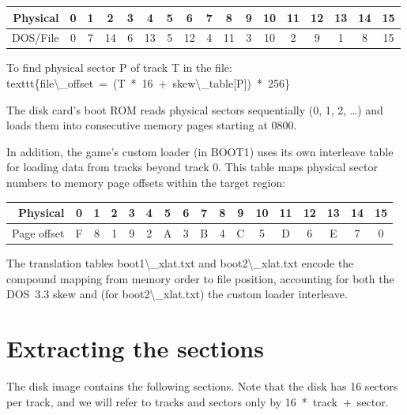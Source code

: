 \documentclass[10pt]{report}
\begin{document}
\begin{center}
\begin{tabular}{r|cccccccccccccccc}
Physical & 0 & 1 & 2 & 3 & 4 & 5 & 6 & 7 & 8 & 9 & 10 & 11 & 12 & 13 & 14 & 15 \\
\hline
DOS/File & 0 & 7 & 14 & 6 & 13 & 5 & 12 & 4 & 11 & 3 & 10 & 2 & 9 & 1 & 8 & 15 \\
\end{tabular}
\end{center}

To find physical sector {\Tt{}P\nwendquote} of track {\Tt{}T\nwendquote} in the file:
{\Tt{}{\textbackslash}texttt\{file{\textbackslash}{\_}offset\ =\ (T\ *\ 16\ +\ skew{\textbackslash}{\_}table[P])\ *\ 256\}\nwendquote}

The disk card's boot ROM reads physical sectors sequentially (0, 1, 2, \ldots)
and loads them into consecutive memory pages starting at {\Tt{}{\$}0800\nwendquote}.

In addition, the game's custom loader (in {\Tt{}BOOT1\nwendquote}) uses its own interleave
table for loading data from tracks beyond track 0. This table maps physical
sector numbers to memory page offsets within the target region:

\begin{center}
\begin{tabular}{r|cccccccccccccccc}
Physical & 0 & 1 & 2 & 3 & 4 & 5 & 6 & 7 & 8 & 9 & 10 & 11 & 12 & 13 & 14 & 15 \\
\hline
Page offset & F & 8 & 1 & 9 & 2 & A & 3 & B & 4 & C & 5 & D & 6 & E & 7 & 0 \\
\end{tabular}
\end{center}

The translation tables {\Tt{}boot1{\textbackslash}{\_}xlat.txt\nwendquote} and {\Tt{}boot2{\textbackslash}{\_}xlat.txt\nwendquote} encode the
compound mapping from memory order to file position, accounting for both the
DOS~3.3 skew and (for {\Tt{}boot2{\textbackslash}{\_}xlat.txt\nwendquote}) the custom loader interleave.

\section{Extracting the sections}

The disk image contains the following sections. Note that the disk has 16
sectors per track, and we will refer to tracks and sectors only by
{\Tt{}16\ *\ track\ +\ sector\nwendquote}.
\end{document}
